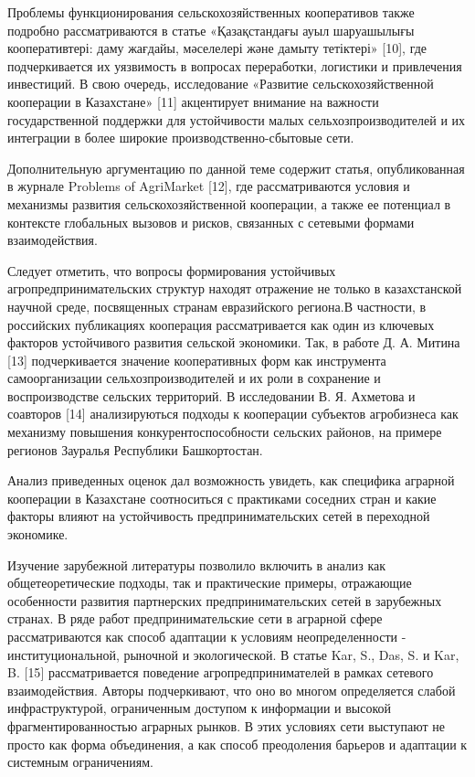 Проблемы функционирования сельскохозяйственных кооперативов также
подробно рассматриваются в статье «Қазақстандағы ауыл шаруашылығы
кооперативтері: даму жағдайы, мәселелері және дамыту тетіктері»
{[}10{]}, где подчеркивается их уязвимость в вопросах переработки,
логистики и привлечения инвестиций. В свою очередь, исследование
«Развитие сельскохозяйственной кооперации в Казахстане» {[}11{]}
акцентирует внимание на важности государственной поддержки для
устойчивости малых сельхозпроизводителей и их интеграции в более широкие
производственно-сбытовые сети.

Дополнительную аргументацию по данной теме содержит статья,
опубликованная в журнале Problems of AgriMarket {[}12{]}, где
рассматриваются условия и механизмы развития сельскохозяйственной
кооперации, а также ее потенциал в контексте глобальных вызовов и
рисков, связанных с сетевыми формами взаимодействия.

Следует отметить, что вопросы формирования устойчивых
агропредпринимательских структур находят отражение не только в
казахстанской научной среде, посвященных странам евразийского региона.В
частности, в российских публикациях кооперация рассматривается как один
из ключевых факторов устойчивого развития сельской экономики. Так, в
работе Д. А. Митина {[}13{]} подчеркивается значение кооперативных форм
как инструмента самоорганизации сельхозпроизводителей и их роли в
сохранение и воспроизводстве сельских территорий. В исследовании В. Я.
Ахметова и соавторов {[}14{]} анализируються подходы к кооперации
субъектов агробизнеса как механизму повышения конкурентоспособности
сельских районов, на примере регионов Зауралья Республики Башкортостан.

Анализ приведенных оценок дал возможность увидеть, как специфика
аграрной кооперации в Казахстане соотноситься с практиками соседних
стран и какие факторы влияют на устойчивость предпринимательских сетей в
переходной экономике.

Изучение зарубежной литературы позволило включить в анализ как
общетеоретические подходы, так и практические примеры, отражающие
особенности развития партнерских предпринимательских сетей в зарубежных
странах. В ряде работ предпринимательские сети в аграрной сфере
рассматриваются как способ адаптации к условиям неопределенности -
институциональной, рыночной и экологической. В статье Kar, S., Das, S. и
Kar, B. {[}15{]} рассматривается поведение агропредпринимателей в рамках
сетевого взаимодействия. Авторы подчеркивают, что оно во многом
определяется слабой инфраструктурой, ограниченным доступом к информации
и высокой фрагментированностью аграрных рынков. В этих условиях сети
выступают не просто как форма объединения, а как способ преодоления
барьеров и адаптации к системным ограничениям.

